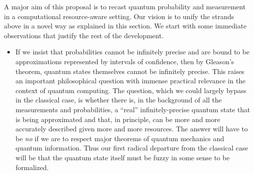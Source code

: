 \documentclass{article}
\theoremstyle{remark}
\begin{document}
A major aim of this proposal is to recast quantum probability and
measurement in a computational resource-aware setting. Our vision is
to unify the strands above in a novel way as explained in this
section. We start with some immediate observations that justify the
rest of the development. 

\begin{itemize}

\item If we insist that probabilities cannot be infinitely precise and
  are bound to be approximations represented by intervals of
  confidence, then by Gleason's theorem, quantum states themselves
  cannot be infinitely precise. This raises an important philosophical
  question with immense practical relevance in the context of quantum
  computing. The question, which we could largely bypass in the
  classical case, is whether there is, in the background of all the
  measurements and probabilities, a ``real'' infinitely-precise
  quantum state that is being approximated and that, in principle, can
  be more and more accurately described given more and more
  resources. The answer will have to be \emph{no} if we are to respect
  major theorems of quantum mechanics and quantum information. Thus
  our first radical departure from the classical case will be that the
  quantum state itself must be fuzzy in some sense to be formalized.


\end{itemize}
\end{document}
